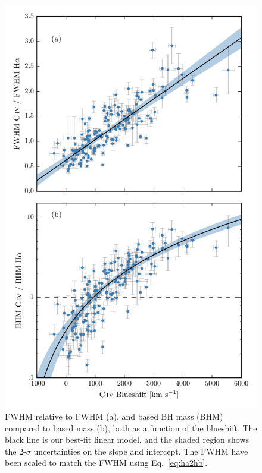 \begin{figure}
    \includegraphics[width=\textwidth]{figures/chapter03/fwhm_and_bhm_ha.pdf} 
    \caption[{ FWHM relative to \ha FWHM (a), and  based BH mass (BHM) compared to \ha based mass (b), both as a function of the  blueshift.}]{ FWHM relative to \ha FWHM (a), and  based BH mass (BHM) compared to \ha based mass (b), both as a function of the  blueshift. The black line is our best-fit linear model, and the shaded region shows the 2-$\sigma$ uncertainties on the slope and intercept. The \ha FWHM have been scaled to match the \hb FWHM using Eq.~\ref{eq:ha2hb}.}  
    \label{fig:correction_ha}
\end{figure}

